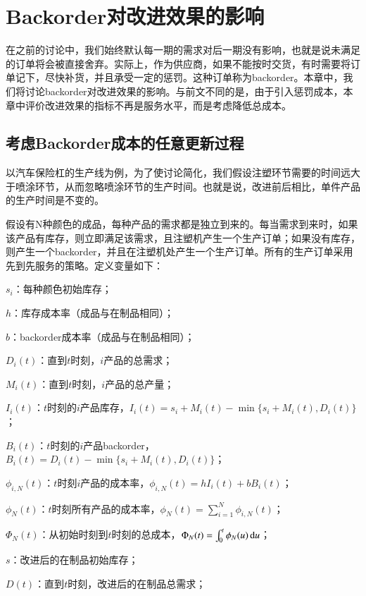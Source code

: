 
\chapter{Backorder对改进效果的影响}

在之前的讨论中，我们始终默认每一期的需求对后一期没有影响，也就是说未满足的订单将会被直接舍弃。实际上，作为供应商，如果不能按时交货，有时需要将订单记下，尽快补货，并且承受一定的惩罚。这种订单称为backorder。本章中，我们将讨论backorder对改进效果的影响。与前文不同的是，由于引入惩罚成本，本章中评价改进效果的指标不再是服务水平，而是考虑降低总成本。




\section{考虑Backorder成本的任意更新过程}

以汽车保险杠的生产线为例，为了使讨论简化，我们假设注塑环节需要的时间远大于喷涂环节，从而忽略喷涂环节的生产时间。也就是说，改进前后相比，单件产品的生产时间是不变的。

假设有N种颜色的成品，每种产品的需求都是独立到来的。每当需求到来时，如果该产品有库存，则立即满足该需求，且注塑机产生一个生产订单；如果没有库存，则产生一个backorder，并且在注塑机处产生一个生产订单。所有的生产订单采用先到先服务的策略。定义变量如下：

$s_i$：每种颜色初始库存；

$h$：库存成本率（成品与在制品相同）；

$b$：backorder成本率（成品与在制品相同）；

$D_i(t)$：直到$t$时刻，$i$产品的总需求；

$M_i(t)$：直到$t$时刻，$i$产品的总产量；

$I_i(t)$：$t$时刻的$i$产品库存，$I_i(t)=s_i+M_i(t)-\min\{s_i+M_i(t),D_i(t)\}$；

$B_i(t)$：$t$时刻的$i$产品backorder，$B_i(t)=D_i(t)-\min\{s_i+M_i(t),D_i(t)\}$；

$\phi_{i,N}(t)$：$t$时刻$i$产品的成本率，$\phi_{i,N}(t)=hI_i(t)+bB_i(t)$；

$\phi_N(t)$：$t$时刻所有产品的成本率，$\phi_N(t)=\sum_{i=1}^N\phi_{i,N}(t)$；

$\Phi_N(t)$：从初始时刻到$t$时刻的总成本，$\Phi_N(t)=\int_0^t\phi_N(u)\operatorname{d\!} u$；

$s$：改进后的在制品初始库存；

$D(t)$：直到$t$时刻，改进后的在制品总需求；

